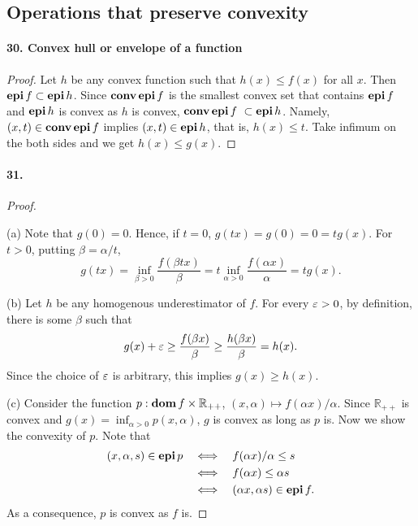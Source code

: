 \subsection{Operations that preserve convexity}
  \paragraph{30. Convex hull or envelope of a function}
  \begin{proof}
    Let $h$ be any convex function such that $h(x)\le f(x)$ for all $x$. Then
    $\operatorname{\mathbf{epi}} f\subset\operatorname{\mathbf{epi}} h$. Since $\operatorname{\mathbf{conv}}\operatorname{\mathbf{epi}} f$ is the smallest convex set that
    contains $\operatorname{\mathbf{epi}} f$ and $\operatorname{\mathbf{epi}} h$ is convex as $h$ is convex, $\operatorname{\mathbf{conv}}\operatorname{\mathbf{epi}} f\
    \subset\operatorname{\mathbf{epi}} h$. Namely, $(x,t)\in\operatorname{\mathbf{conv}}\operatorname{\mathbf{epi}} f$ implies $(x,t)\in\operatorname{\mathbf{epi}} h$, that
    is, $h(x)\le t$. Take infimum on the both sides and we get $h(x)\le g(x)$.
  \end{proof}
  
  \paragraph{31.}
  \begin{proof}
    $\,$\par
    (a) Note that $g(0)=0$. Hence, if $t=0$, $g(tx)=g(0)=0=tg(x)$. For $t>0$, 
    putting $\beta=\alpha/t$, 
    \[
      g(tx)=\inf_{\beta>0}\frac{f(\beta tx)}{\beta}=
      t\inf_{\alpha>0}\frac{f(\alpha x)}{\alpha}=tg(x).
    \]\par
    (b) Let $h$ be any homogenous underestimator of $f$. For every $\varepsilon>0$, by
    definition, there is some $\beta$ such that
    \[
      g(x)+\varepsilon\ge\frac{f(\beta x)}{\beta}\ge \frac{h(\beta x)}{\beta}=h(x).
    \]
    Since the choice of $\varepsilon$ is arbitrary, this implies $g(x)\ge h(x)$.\par
    (c) Consider the function $p:\operatorname{\mathbf{dom}} f\times\mathbb{R}_{++}$, $(x,\alpha)
    \mapsto f(\alpha x)/\alpha$. Since $\mathbb{R}_{++}$ is convex and $g(x)=
    \inf_{\alpha>0}p(x,\alpha)$, $g$ is convex as long as $p$ is. Now we show
    the convexity of $p$. Note that
    \begin{align*}
      (x,\alpha,s)\in\operatorname{\mathbf{epi}} p 
      &\quad\Longleftrightarrow\quad f(\alpha x)/\alpha\le s \\
      &\quad\Longleftrightarrow\quad f(\alpha x)\le \alpha s \\
      &\quad\Longleftrightarrow\quad (\alpha x,\alpha s)\in\operatorname{\mathbf{epi}} f.
    \end{align*}
    As a consequence, $p$ is convex as $f$ is.
  \end{proof}




















